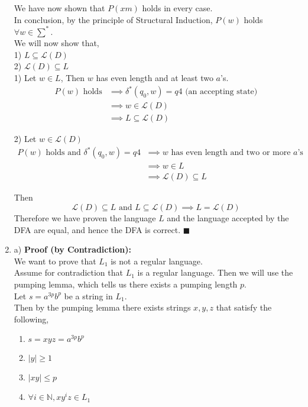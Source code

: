 \documentclass{article}
\newcommand{\N}{\mathbb{N}}
\newcommand{\fancyL}{\mathcal{L}}
\begin{document}
\begin{enumerate}
	We have now shown that $P(xm)$ holds in every case. \\
	In conclusion, by the principle of Structural Induction, $P(w)$ holds $\forall w \in \sum^*$.\\
	
	We will now show that, \\
	1) $L \subseteq \fancyL(D)$\\
	2) $\fancyL(D) \subseteq L$\\
	
	1) Let $w \in L$, Then $w$ has even length and at least two $a$'s.\\
	\begin{align*}
	P(w) \text{ holds} &\implies \delta^*(q_0, w) = q4 \text{\ \ \ (an accepting state)}\\
	&\implies w \in \fancyL(D)\\
	&\implies L \subseteq \fancyL(D)
	\end{align*}
	
	2) Let $w \in \fancyL(D)$\\
	\begin{align*}
	P(w) \text{ holds and }  \delta^*(q_0, w) = q4 &\implies w \text{ has even length and two or more $a$'s}\\
	&\implies w \in L\\
	&\implies \fancyL(D) \subseteq L
	\end{align*}
	
	Then $$\fancyL(D) \subseteq L \text{ and }  L \subseteq \fancyL(D) \implies  L = \fancyL(D)$$
	Therefore we have proven the language $L$ and the language accepted by the DFA are equal, and hence the DFA is correct. \null\hfill $\blacksquare$ \\
	
	
	\item a) \textbf{Proof (by Contradiction):}\\
	We want to prove that $L_1$ is not a regular language. \\
  	Assume for contradiction that $L_1$ is a regular language. Then we will use the pumping lemma, which tells us there exists a pumping length $p$. \\
  	Let $s = a^{3p}b^p$ be a string in $L_1$.\\
  	Then by the pumping lemma there exists strings $x,y,z$ that satisfy the following, 
  	\begin{enumerate}[label = \arabic*.]
  	\item  $s = xyz =  a^{3p}b^p$
  	\item $|y| \geq 1$
  	\item $|xy| \leq p$
  	\item $\forall i \in \N, xy^iz \in L_1$
  	\end{enumerate}
  	

\end{enumerate}
\end{document}
